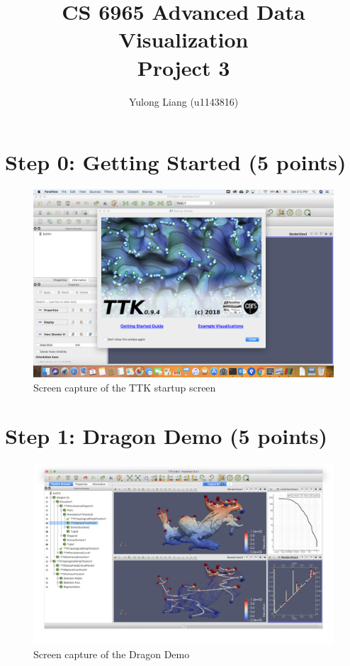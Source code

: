 \documentclass[12pt]{article}
\begin{document}
\title{CS 6965 Advanced Data Visualization\\{\bf Project 3}}
\author{Yulong Liang (u1143816)}
\maketitle

\section*{Step 0: Getting Started (5 points)}

\begin{figure}[h]
\centering
\includegraphics[width=1\linewidth]{1.png}
\caption{Screen capture of the TTK startup screen}
\label{fig:name}
\end{figure}

\section*{Step 1: Dragon Demo (5 points)}

\begin{figure}[h]
\centering
\includegraphics[width=1\linewidth]{2.png}
\caption{Screen capture of the Dragon Demo}
\label{fig:name}
\end{figure}
\end{document}
